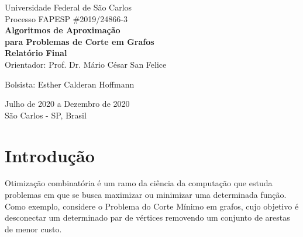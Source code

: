 \documentclass[12pt, a4paper]{article}
\begin{document}
\begin{titlepage}
	\begin{center}
    	\large{Universidade Federal de São Carlos}\\
    	\vspace{65pt}
    	\vspace{35pt}
    	\large{Processo FAPESP \#2019/24866-3}\\ 
        \vspace{95pt}
        \textbf{\LARGE{Algoritmos de Aproximação\\para Problemas de Corte em Grafos}}\\
        \vspace{0,5cm}
        \textbf{Relatório Final}\\
        \vspace{2,5cm}
        Orientador: Prof. Dr. Mário César San Felice
            
        Bolsista: Esther Calderan Hoffmann
    	\vspace{2,5cm}
	\end{center}
	
	\begin{flushleft}
		\begin{tabbing}
			
	\end{tabbing}
 \end{flushleft}
	\vspace{1cm}
	
	\begin{center}
		\vspace{\fill}
		 Julho de 2020 a Dezembro de 2020\\
		 São Carlos - SP, Brasil
			\end{center}
\end{titlepage}

\newpage
\tableofcontents
\thispagestyle{empty}
\newpage



\section{Introdução} \label{sec:introduction}
Otimização combinatória é um ramo da ciência da computação que estuda problemas em que se busca maximizar ou minimizar uma determinada função.
Como exemplo, considere o Problema do Corte Mínimo em grafos, cujo objetivo é desconectar um determinado par de vértices removendo um conjunto de arestas de menor custo.
\end{document}
